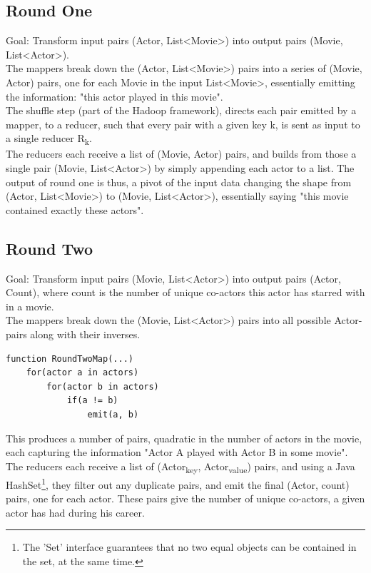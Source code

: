 \documentclass[a4paper,11pt]{article}
\begin{document}
\subsection{Round One}
Goal: Transform input pairs (Actor, List<Movie>) into output pairs (Movie, List<Actor>).\\

The mappers break down the (Actor, List<Movie>) pairs into a series of (Movie, Actor) pairs, one for each Movie in the input List<Movie>, essentially emitting the information: "this actor played in this movie".\\

The shuffle step (part of the Hadoop framework), directs each pair emitted by a mapper, to a reducer, such that every pair with a given key k, is sent as input to a single reducer R\textsubscript{k}.\\

The reducers each receive a list of (Movie, Actor) pairs, and builds from those a single pair (Movie, List<Actor>) by simply appending each actor to a list. The output of round one is thus, a pivot of the input data changing the shape from (Actor, List<Movie>) to (Movie, List<Actor>), essentially saying "this movie contained exactly these actors".

\subsection{Round Two}
\label{sub}
Goal: Transform input pairs (Movie, List<Actor>) into output pairs (Actor, Count), where count is the number of unique co-actors this actor has starred with in a movie.\\

The mappers break down the (Movie, List<Actor>) pairs into all possible Actor-pairs along with their inverses.

\begin{verbatim}
function RoundTwoMap(...)
    for(actor a in actors)
        for(actor b in actors)
            if(a != b)
                emit(a, b)
\end{verbatim}

This produces a number of pairs, quadratic in the number of actors in the movie, each capturing the information "Actor A played with Actor B in some movie".\\

The reducers each receive a list of (Actor\textsubscript{key}, Actor\textsubscript{value}) pairs, and using a Java HashSet\footnote{The 'Set' interface guarantees that no two equal objects can be contained in the set, at the same time.}, they filter out any duplicate pairs, and emit the final (Actor, count) pairs, one for each actor. These pairs give the number of unique co-actors, a given actor has had during his career.
\end{document}
